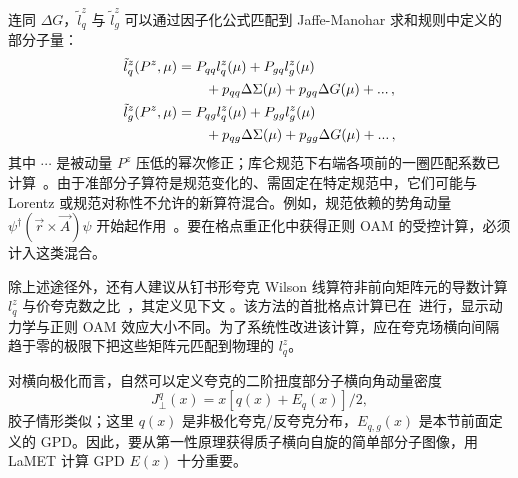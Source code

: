 连同 $\Delta G$，$\tilde l^z_q$ 与 $\tilde l^z_g$ 可以通过因子化公式匹配到 Jaffe-Manohar 求和规则中定义的部分子量：
\begin{align}\label{eq:oammatching}
	\tilde l^z_q(P^z,\mu)  &= P_{qq}  l^z_q(\mu) + P_{gq} l^z_g(\mu) \nonumber\\
	&\qquad+ p_{qq} \Delta \Sigma(\mu) + p_{gq}\Delta G(\mu) + ...\, ,\\
	\tilde l^z_g(P^z,\mu)  &= P_{qg}  l^z_q(\mu) + P_{gg} l^z_g(\mu) \nonumber\\
	&\qquad+ p_{qg} \Delta \Sigma(\mu) + p_{gg}\Delta G(\mu) + ...\, ,
\end{align}
其中 $\cdots$ 是被动量 $P^z$ 压低的幂次修正；库仑规范下右端各项前的一圈匹配系数已计算~\cite{Ji:2014lra}。由于准部分子算符是规范变化的、需固定在特定规范中，它们可能与 Lorentz 或规范对称性不允许的新算符混合。例如，规范依赖的势角动量 $\psi^\dagger(\vec{r}\times \vec{A})\psi$ 开始起作用~\cite{Wakamatsu:2014zza,Ji:2015sio}。要在格点重正化中获得正则 OAM 的受控计算，必须计入这类混合。

除上述途径外，还有人建议从钉书形夸克 Wilson 线算符非前向矩阵元的导数计算 $l_q^z$ 与价夸克数之比~\cite{Engelhardt:2017miy}，其定义见下文 。该方法的首批格点计算已在~\cite{Engelhardt:2017miy,Engelhardt:2019lyy}进行，显示动力学与正则 OAM 效应大小不同。{为了系统性改进该计算，应在夸克场横向间隔趋于零的极限下把这些矩阵元匹配到物理的 $l_q^z$。}

对横向极化而言，自然可以定义夸克的二阶扭度部分子横向角动量密度~\cite{Hoodbhoy:1998yb,Ji:2012sj,Ji:2020hii,Ji:2020ena}
\begin{equation}
	J^{q}_\perp (x) = x\left[q(x)+ E_q(x)\right]/2,
\end{equation}
胶子情形类似；这里 $q(x)$ 是非极化夸克/反夸克分布，$E_{q,g}(x)$ 是本节前面定义的 GPD。因此，要从第一性原理获得质子横向自旋的简单部分子图像，用 LaMET 计算 GPD $E(x)$ 十分重要。

